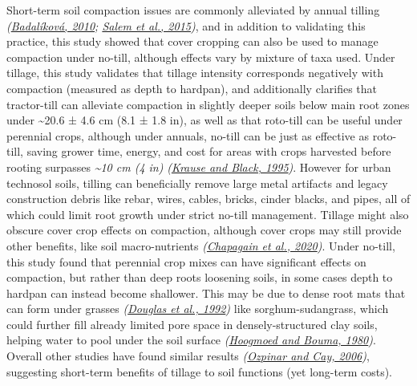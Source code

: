 \documentclass[
  12pt,
]{article}
\begin{document}
Short-term soil compaction issues are commonly alleviated by annual tilling \emph{(\protect\hyperlink{ref-badalikova10}{Badalíková, 2010}; \protect\hyperlink{ref-salem15}{Salem et al., 2015})}, and in addition to validating this practice, this study showed that cover cropping can also be used to manage compaction under no-till, although effects vary by mixture of taxa used.
Under tillage, this study validates that tillage intensity corresponds negatively with compaction (measured as depth to hardpan), and additionally clarifies that tractor-till can alleviate compaction in slightly deeper soils below main root zones under
\textasciitilde20.6 ±
4.6 cm
(8.1 ±
1.8 in),
as well as that roto-till can be useful under perennial crops, although under annuals, no-till can be just as effective as roto-till, saving grower time, energy, and cost for areas with crops harvested before rooting surpasses \emph{\textasciitilde10 cm (4 in)} \emph{(\protect\hyperlink{ref-krause95}{Krause and Black, 1995})}.
However for urban technosol soils, tilling can beneficially remove large metal artifacts and legacy construction debris like rebar, wires, cables, bricks, cinder blacks, and pipes, all of which could limit root growth under strict no-till management.
Tillage might also obscure cover crop effects on compaction, although cover crops may still provide other benefits, like soil macro-nutrients \emph{(\protect\hyperlink{ref-chapagain20}{Chapagain et al., 2020})}.
Under no-till, this study found that perennial crop mixes can have significant effects on compaction, but rather than deep roots loosening soils, in some cases depth to hardpan can instead become shallower.
This may be due to dense root mats that can form under grasses \emph{(\protect\hyperlink{ref-douglas92}{Douglas et al., 1992})} like sorghum-sudangrass, which could further fill already limited pore space in densely-structured clay soils, helping water to pool under the soil surface \emph{(\protect\hyperlink{ref-hoogmoed80}{Hoogmoed and Bouma, 1980})}.
Overall other studies have found similar results \emph{(\protect\hyperlink{ref-ozpinar06}{Ozpinar and Cay, 2006})}, suggesting short-term benefits of tillage to soil functions (yet long-term costs).
\end{document}
